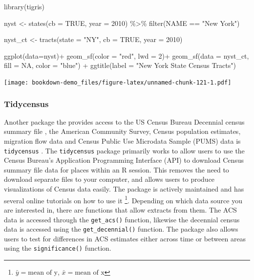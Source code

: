 \documentclass[
]{article}
\newenvironment{Shaded}{\begin{snugshade}}{\end{snugshade}}
\newcommand{\AttributeTok}[1]{\textcolor[rgb]{0.77,0.63,0.00}{#1}}
\newcommand{\ConstantTok}[1]{\textcolor[rgb]{0.00,0.00,0.00}{#1}}
\newcommand{\DecValTok}[1]{\textcolor[rgb]{0.00,0.00,0.81}{#1}}
\newcommand{\FunctionTok}[1]{\textcolor[rgb]{0.00,0.00,0.00}{#1}}
\newcommand{\NormalTok}[1]{#1}
\newcommand{\OtherTok}[1]{\textcolor[rgb]{0.56,0.35,0.01}{#1}}
\newcommand{\SpecialCharTok}[1]{\textcolor[rgb]{0.00,0.00,0.00}{#1}}
\newcommand{\StringTok}[1]{\textcolor[rgb]{0.31,0.60,0.02}{#1}}
\begin{document}
\begin{Shaded}
\begin{Highlighting}[]
\FunctionTok{library}\NormalTok{(tigris)}

\NormalTok{nyst }\OtherTok{\textless{}{-}} \FunctionTok{states}\NormalTok{(}\AttributeTok{cb =} \ConstantTok{TRUE}\NormalTok{,}
               \AttributeTok{year =} \DecValTok{2010}\NormalTok{) }\SpecialCharTok{\%\textgreater{}\%}
  \FunctionTok{filter}\NormalTok{(NAME }\SpecialCharTok{==} \StringTok{"New York"}\NormalTok{)}

\NormalTok{nyst\_ct }\OtherTok{\textless{}{-}} \FunctionTok{tracts}\NormalTok{(}\AttributeTok{state =} \StringTok{"NY"}\NormalTok{,}
                  \AttributeTok{cb =} \ConstantTok{TRUE}\NormalTok{,}
                  \AttributeTok{year =} \DecValTok{2010}\NormalTok{)}

\FunctionTok{ggplot}\NormalTok{(}\AttributeTok{data=}\NormalTok{nyst)}\SpecialCharTok{+}
  \FunctionTok{geom\_sf}\NormalTok{(}\AttributeTok{color =} \StringTok{"red"}\NormalTok{, }
          \AttributeTok{lwd =} \DecValTok{2}\NormalTok{)}\SpecialCharTok{+}
   \FunctionTok{geom\_sf}\NormalTok{(}\AttributeTok{data =}\NormalTok{ nyst\_ct,}
           \AttributeTok{fill =} \ConstantTok{NA}\NormalTok{,}
           \AttributeTok{color =} \StringTok{"blue"}\NormalTok{) }\SpecialCharTok{+} 
  \FunctionTok{ggtitle}\NormalTok{(}\AttributeTok{label =} \StringTok{"New York State Census Tracts"}\NormalTok{)}
\end{Highlighting}
\end{Shaded}

\texttt{[image: bookdown-demo\_files/figure-latex/unnamed-chunk-121-1.pdf]}

\hypertarget{tidycensus}{%
\subsubsection{Tidycensus}\label{tidycensus}}

Another package the provides access to the US Census Bureau Decennial census summary file , the American Community Survey, Census population estimates, migration flow data and Census Public Use Microdata Sample (PUMS) data is \texttt{tidycensus} \citep{walker21}. The \texttt{tidycensus} package primarily works to allow users to use the Census Bureau's Application Programming Interface (API) to download Census summary file data for places within an R session. This removes the need to download separate files to your computer, and allows users to produce visualizations of Census data easily. The package is actively maintained and has several online tutorials on how to use it \footnote{\(\bar{y}= \text{mean of y}\), \(\bar{x}= \text{mean of x}\)}. Depending on which data source you are interested in, there are functions that allow extracts from them. The ACS data is accessed through the \texttt{get\_acs()} function, likewise the decennial census data is accessed using the \texttt{get\_decennial()} function. The package also allows users to test for differences in ACS estimates either across time or between areas using the \texttt{significance()} function.
\end{document}
